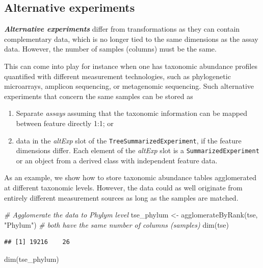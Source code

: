 \documentclass[
]{book}
\newenvironment{Shaded}{\begin{snugshade}}{\end{snugshade}}
\newcommand{\CommentTok}[1]{\textcolor[rgb]{0.56,0.35,0.01}{\textit{#1}}}
\newcommand{\FunctionTok}[1]{\textcolor[rgb]{0.00,0.00,0.00}{#1}}
\newcommand{\NormalTok}[1]{#1}
\newcommand{\OtherTok}[1]{\textcolor[rgb]{0.56,0.35,0.01}{#1}}
\newcommand{\StringTok}[1]{\textcolor[rgb]{0.31,0.60,0.02}{#1}}
\providecommand{\tightlist}{%
  \setlength{\itemsep}{0pt}\setlength{\parskip}{0pt}}
\begin{document}
\hypertarget{alt-exp}{%
\subsection{Alternative experiments}\label{alt-exp}}

\emph{\textbf{Alternative experiments}} differ from transformations as they can
contain complementary data, which is no longer tied to the same
dimensions as the assay data. However, the number of samples (columns)
must be the same.

This can come into play for instance when one has taxonomic abundance
profiles quantified with different measurement technologies, such as
phylogenetic microarrays, amplicon sequencing, or metagenomic
sequencing. Such alternative experiments that concern the same samples
can be stored as

\begin{enumerate}
\def\labelenumi{\arabic{enumi}.}
\tightlist
\item
  Separate \emph{assays} assuming that the taxonomic information can be mapped
  between feature directly 1:1; or
\item
  data in the \emph{altExp} slot of the \texttt{TreeSummarizedExperiment}, if the feature
  dimensions differ. Each element of the \emph{altExp} slot is a \texttt{SummarizedExperiment}
  or an object from a derived class with independent feature data.
\end{enumerate}

As an example, we show how to store taxonomic abundance tables
agglomerated at different taxonomic levels. However, the data could as
well originate from entirely different measurement sources as long as
the samples are matched.

\begin{Shaded}
\begin{Highlighting}[]
\CommentTok{\# Agglomerate the data to Phylym level}
\NormalTok{tse\_phylum }\OtherTok{\textless{}{-}} \FunctionTok{agglomerateByRank}\NormalTok{(tse, }\StringTok{"Phylum"}\NormalTok{)}
\CommentTok{\# both have the same number of columns (samples)}
\FunctionTok{dim}\NormalTok{(tse)}
\end{Highlighting}
\end{Shaded}

\begin{verbatim}
## [1] 19216    26
\end{verbatim}

\begin{Shaded}
\begin{Highlighting}[]
\FunctionTok{dim}\NormalTok{(tse\_phylum)}
\end{Highlighting}
\end{Shaded}
\end{document}
